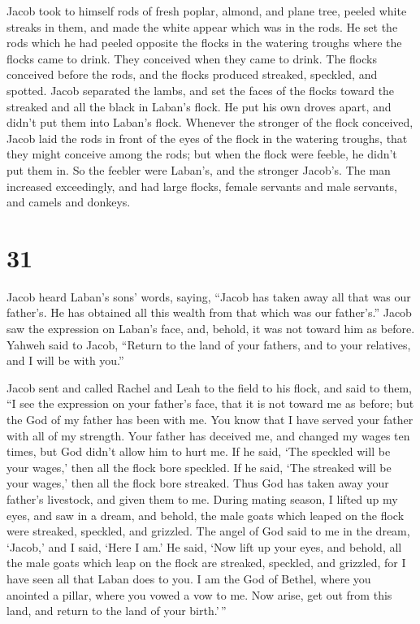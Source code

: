  Jacob took to himself rods of fresh poplar, almond, and
plane tree, peeled white streaks in them, and made the white appear
which was in the rods.  He set the rods which he had
peeled opposite the flocks in the watering troughs where the flocks came
to drink. They conceived when they came to drink.  The
flocks conceived before the rods, and the flocks produced streaked,
speckled, and spotted.  Jacob separated the lambs, and
set the faces of the flocks toward the streaked and all the black in
Laban's flock. He put his own droves apart, and didn't put them into
Laban's flock.  Whenever the stronger of the flock
conceived, Jacob laid the rods in front of the eyes of the flock in the
watering troughs, that they might conceive among the rods;
 but when the flock were feeble, he didn't put them in.
So the feebler were Laban's, and the stronger Jacob's. 
The man increased exceedingly, and had large flocks, female servants and
male servants, and camels and donkeys.

\hypertarget{section-30}{%
\section{31}\label{section-30}}

 Jacob heard Laban's sons' words, saying, ``Jacob has
taken away all that was our father's. He has obtained all this wealth
from that which was our father's.''  Jacob saw the
expression on Laban's face, and, behold, it was not toward him as
before.  Yahweh said to Jacob, ``Return to the land of
your fathers, and to your relatives, and I will be with you.''

 Jacob sent and called Rachel and Leah to the field to his
flock,  and said to them, ``I see the expression on your
father's face, that it is not toward me as before; but the God of my
father has been with me.  You know that I have served your
father with all of my strength.  Your father has deceived
me, and changed my wages ten times, but God didn't allow him to hurt me.
 If he said, `The speckled will be your wages,' then all
the flock bore speckled. If he said, `The streaked will be your wages,'
then all the flock bore streaked.  Thus God has taken away
your father's livestock, and given them to me.  During
mating season, I lifted up my eyes, and saw in a dream, and behold, the
male goats which leaped on the flock were streaked, speckled, and
grizzled.  The angel of God said to me in the dream,
`Jacob,' and I said, `Here I am.'  He said, `Now lift up
your eyes, and behold, all the male goats which leap on the flock are
streaked, speckled, and grizzled, for I have seen all that Laban does to
you.  I am the God of Bethel, where you anointed a
pillar, where you vowed a vow to me. Now arise, get out from this land,
and return to the land of your birth.'\,''

